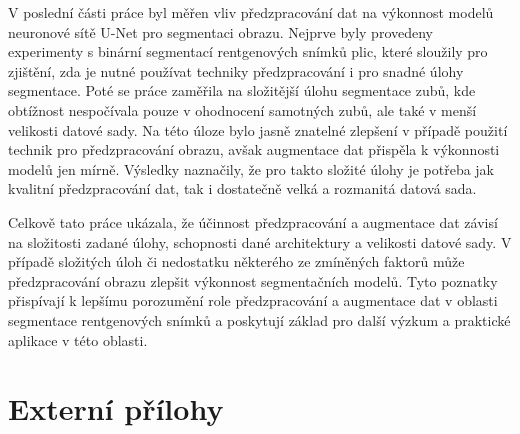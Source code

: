 \documentclass[male,czech,api_ing]{thesis}
\begin{document}
V poslední části práce byl měřen vliv předzpracování dat na výkonnost modelů neuronové sítě U-Net pro segmentaci obrazu. Nejprve byly provedeny experimenty s binární segmentací rentgenových snímků plic, které sloužily pro zjištění, zda je nutné používat techniky předzpracování i pro snadné úlohy segmentace. Poté se práce zaměřila na složitější úlohu segmentace zubů, kde obtížnost nespočívala pouze v ohodnocení samotných zubů, ale také v menší velikosti datové sady. Na této úloze bylo jasně znatelné zlepšení v případě použití technik pro předzpracování obrazu, avšak augmentace dat přispěla k výkonnosti modelů jen mírně. Výsledky naznačily, že pro takto složité úlohy je potřeba jak kvalitní předzpracování dat, tak i dostatečně velká a rozmanitá datová sada.

Celkově tato práce ukázala, že účinnost předzpracování a augmentace dat závisí na složitosti zadané úlohy, schopnosti dané architektury a velikosti datové sady. V případě složitých úloh či nedostatku některého ze zmíněných faktorů může předzpracování obrazu zlepšit výkonnost segmentačních modelů. Tyto poznatky přispívají k lepšímu porozumění role předzpracování a augmentace dat v oblasti segmentace rentgenových snímků a poskytují základ pro další výzkum a praktické aplikace v této oblasti.

\printbibliography[title=Seznam použitých zdrojů]

\listoffigures

\listoftables

\lstlistoflistings

\appendix

\chapter{Externí přílohy\label{sec:ep}}


\end{document}
